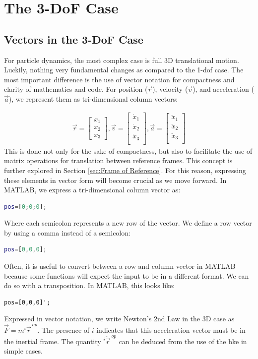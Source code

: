 \documentclass[12pt]{report}
\begin{document}
\section{The 3-DoF Case}\label{sec: 3DoF Case}
\subsection{Vectors in the 3-DoF Case}
For particle dynamics, the most complex case is full 3D translational motion. Luckily, nothing very fundamental changes as compared to the 1-\gls{dof} case. The most important difference is the use of vector notation for compactness and clarity of mathematics and code. For position ($\vec{r}$), velocity ($\vec {v}$), and acceleration ($\vec{a}$), we represent them as tri-dimensional column vectors:

\begin{gather}
    \vec{r}=\begin{bmatrix}
        x_1\\
        x_2\\
        x_3
    \end{bmatrix},
    \vec{v}=\begin{bmatrix}
        \dot{x}_1\\
        \dot{x}_2\\
        \dot{x}_3\\
    \end{bmatrix},
        \vec{a}=\begin{bmatrix}
        \ddot{x}_1\\
        \ddot{x}_2\\
        \ddot{x}_3\\
    \end{bmatrix}
\end{gather}
This is done not only for the sake of compactness, but also to facilitate the use of matrix operations for translation between reference frames. This concept is further explored in Section \ref{sec:Frame of Reference}. For this reason, expressing these elements in vector form will become crucial as we move forward. In MATLAB, we express a tri-dimensional column vector as:
\begin{lstlisting}[language=Matlab]
pos=[0;0;0];
\end{lstlisting}
Where each semicolon represents a new row of the vector. We define a row vector by using a comma instead of a semicolon: 
\begin{lstlisting}[language=Matlab]
pos=[0,0,0];
\end{lstlisting}
Often, it is useful to convert between a row and column vector in MATLAB because some functions will expect the input to be in a different format. We can do so with a transposition. In MATLAB, this looks like: 
\begin{lstlisting}
pos=[0,0,0]';
\end{lstlisting}
Expressed in vector notation, we write Newton's 2nd Law in the 3D case as $\vec{F}=m{}^i\ddot{\vec{r}}^{\ op}$. The presence of $i$ indicates that this acceleration vector must be in the \gls{inertial frame}. The quantity ${}^i\ddot{\vec{r}}^{\ op}$ can be deduced from the use of the \gls{bke} in simple cases.
\end{document}
